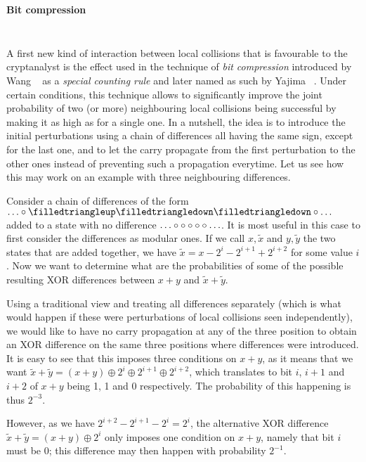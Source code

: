\medskip

\paragraph{Bit compression}
$\phantom{bouh}$

\medskip

\noindent
A first new kind of interaction between local collisions that is favourable to the cryptanalyst is the effect used in the technique of \emph{bit compression} introduced by Wang \etal~\cite{DBLP:conf/crypto/WangYY05a}
as a \emph{special counting rule} and later named as such by Yajima \etal~\cite{DBLP:conf/ccs/YajimaINSSKO08}. Under certain conditions, this technique allows to significantly
improve the joint probability of two (or more) neighbouring local collisions being successful by making it as high as for a single one. In a nutshell, the idea is to introduce the initial perturbations
using a chain of differences all
having the same sign, except for the last one, and to let the carry propagate from the first
perturbation to the other ones instead of preventing such a propagation everytime.
Let us see how this may work on an example with three neighbouring differences.

\begin{example}
\label{ex:bit_comp}
Consider a chain of differences of the form $\ldots\mnodiff\monediffu\monediffd\monediffd\mnodiff\ldots$ added to a state with no difference $\ldots\circ\circ\circ\circ\circ\ldots$.
It is most useful in this case to first consider the differences as modular ones. If we call $x,\widetilde{x}$ and $y,\widetilde{y}$ the two states that are added together, we
have $\widetilde{x} = x - 2^{i} - 2^{i+1} + 2^{i+2}$ for some value $i$. Now we want to determine what are the probabilities of some of the possible resulting XOR differences between $x + y$ and $\widetilde{x} + \widetilde{y}$.

Using a traditional view and treating all differences separately (which is what would happen if these were perturbations of local collisions seen independently), we would like to have no
carry propagation at any of the three position to obtain an XOR difference on the same three positions where differences were introduced. It is easy to see that this imposes three conditions
on $x + y$, as it means that we want $\widetilde{x} + \widetilde{y} = (x + y) \oplus 2^{i} \oplus 2^{i+1} \oplus 2^{i+2}$, which translates to bit $i$, $i+1$ and $i+2$ of $x+y$ being 1, 1 and 0 respectively.
The probability of this happening is thus $2^{-3}$.

However, as we have $2^{i+2} - 2^{i+1} - 2^{i} = 2^{i}$, the alternative XOR difference $\widetilde{x} + \widetilde{y} = (x + y) \oplus 2^{i}$ only imposes one condition on $x + y$, namely that bit $i$
must be 0; this difference may then happen with probability $2^{-1}$.
\end{example}

